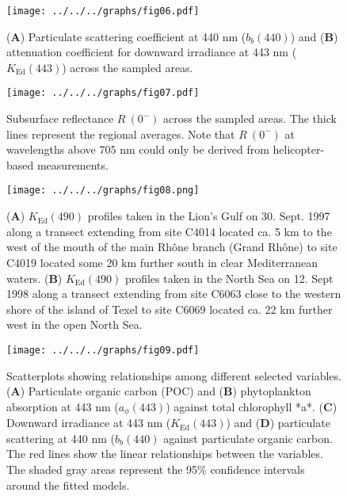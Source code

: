 \documentclass[essd, manuscript]{copernicus}
\begin{document}
\clearpage

\begin{figure}[t]
    \texttt{[image: ../../../graphs/fig06.pdf]}
    \caption{(\textbf{A}) Particulate scattering coefficient at 440 nm ($b_{b}(440)$) and (\textbf{B}) attenuation coefficient for downward irradiance at 443 nm ($K_{\text{Ed}}(443)$) across the sampled areas.}
\end{figure}

\clearpage

\begin{figure}[t]
    \texttt{[image: ../../../graphs/fig07.pdf]}
    \caption{Subsurface reflectance $R~(0^{-})$ across the sampled areas. The thick lines represent the regional averages. Note that $R~(0^{-})$ at wavelengths above 705 nm could only be derived from helicopter-based measurements.}
\end{figure}

\clearpage

\begin{figure}[t]
    \texttt{[image: ../../../graphs/fig08.png]}
    \caption{(\textbf{A}) $K_{\text{Ed}}(490)$ profiles taken in the Lion's Gulf on 30. Sept. 1997 along a transect extending from site C4014 located ca. 5 km to the west of the mouth of the main Rhône branch (Grand Rhône) to site C4019 located some 20 km further south in clear Mediterranean waters. (\textbf{B}) $K_{\text{Ed}}(490)$ profiles taken in the North Sea on 12. Sept 1998 along a transect extending from site C6063 close to the western shore of the island of Texel to site C6069 located ca. 22 km further west in the open North Sea.}
\end{figure}

\clearpage

\begin{figure}[t]
    \texttt{[image: ../../../graphs/fig09.pdf]}
    \caption{Scatterplots showing relationships among different selected variables. (\textbf{A}) Particulate organic carbon (POC) and (\textbf{B}) phytoplankton absorption at 443 nm ($a_{\phi}(443)$) against total chlorophyll *a*. (\textbf{C}) Downward irradiance at 443 nm ($K_{\text{Ed}}(443)$) and (\textbf{D}) particulate scattering at 440 nm ($b_{b}(440)$ against particulate organic carbon. The red lines show the linear relationships between the variables. The shaded gray areas represent the 95\% confidence intervals around the fitted models.}
\end{figure}



\end{document}
